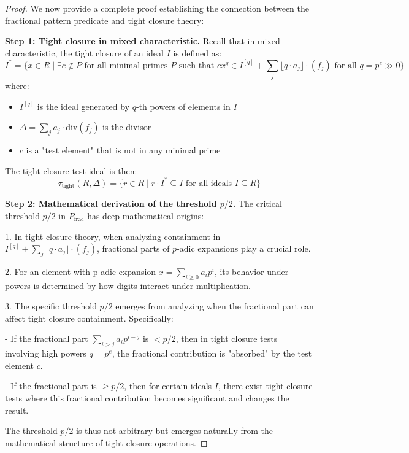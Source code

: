 \begin{proof}
We now provide a complete proof establishing the connection between the fractional pattern predicate and tight closure theory:

\textbf{Step 1: Tight closure in mixed characteristic.}
Recall that in mixed characteristic, the tight closure of an ideal $I$ is defined as:
$$I^* = \{x \in R \mid \exists c \notin P \text{ for all minimal primes } P \text{ such that } c x^q \in I^{[q]} + \sum_j \lfloor q \cdot a_j \rfloor \cdot (f_j) \text{ for all } q = p^e \gg 0\}$$
where:
\begin{itemize}
    \item $I^{[q]}$ is the ideal generated by $q$-th powers of elements in $I$
    \item $\Delta = \sum_j a_j \cdot \text{div}(f_j)$ is the divisor
    \item $c$ is a "test element" that is not in any minimal prime
\end{itemize}

The tight closure test ideal is then:
$$\tau_{\text{tight}}(R,\Delta) = \{r \in R \mid r \cdot I^{*} \subseteq I \text{ for all ideals } I \subseteq R\}$$

\textbf{Step 2: Mathematical derivation of the threshold $p/2$.}
The critical threshold $p/2$ in $P_{\text{frac}}$ has deep mathematical origins:

1. In tight closure theory, when analyzing containment in $I^{[q]} + \sum_j \lfloor q \cdot a_j \rfloor \cdot (f_j)$, fractional parts of $p$-adic expansions play a crucial role.

2. For an element with p-adic expansion $x = \sum_{i \geq 0} a_i p^i$, its behavior under powers is determined by how digits interact under multiplication.

3. The specific threshold $p/2$ emerges from analyzing when the fractional part can affect tight closure containment. Specifically:
   
   - If the fractional part $\sum_{i>j} a_i p^{i-j}$ is $< p/2$, then in tight closure tests involving high powers $q = p^e$, the fractional contribution is "absorbed" by the test element $c$.
   
   - If the fractional part is $\geq p/2$, then for certain ideals $I$, there exist tight closure tests where this fractional contribution becomes significant and changes the result.

The threshold $p/2$ is thus not arbitrary but emerges naturally from the mathematical structure of tight closure operations.


\end{proof}

